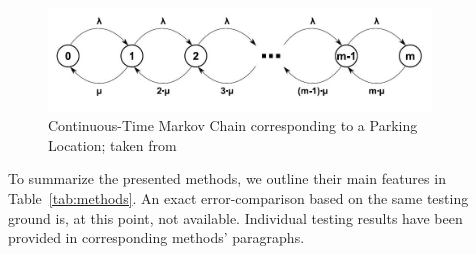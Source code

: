 \documentclass{article}
\begin{document}
\begin{figure}[!ht]
    \centering
    \includegraphics[width=4.0in]{markov-chain}
    \caption{Continuous-Time Markov Chain corresponding to a Parking Location; taken from \cite{Caliskan2007}}
    \label{fig:markov-chain}
\end{figure}

To summarize the presented methods, we outline their main features in Table~\ref{tab:methods}. An exact error-comparison based on the same testing ground is, at this point, not available. Individual testing results have been provided in corresponding methods' paragraphs.
\end{document}
